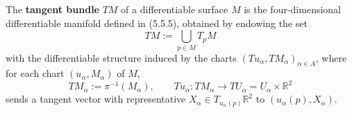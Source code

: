The \textbf{tangent bundle} $TM$ of a differentiable surface $M$ is the four-dimensional differentiable manifold defined in (5.5.5), obtained by endowing the set
$$TM := \bigcup_{p \in M} T_p M$$
with the differentiable structure induced by the charts $(Tu_{\alpha}, TM_{\alpha})_{\alpha \in A}$, where for each chart $(u_{\alpha}, M_{\alpha})$ of $M$,
$$TM_{\alpha} := \pi^{-1}(M_{\alpha}), \qquad Tu_{\alpha}: TM_{\alpha} \to TU_{\alpha} = U_{\alpha} \times \mathbb{R}^2$$
sends a tangent vector with representative $X_{\alpha} \in T_{u_{\alpha}(p)}\mathbb{R}^2$ to $(u_{\alpha}(p), X_{\alpha})$.
